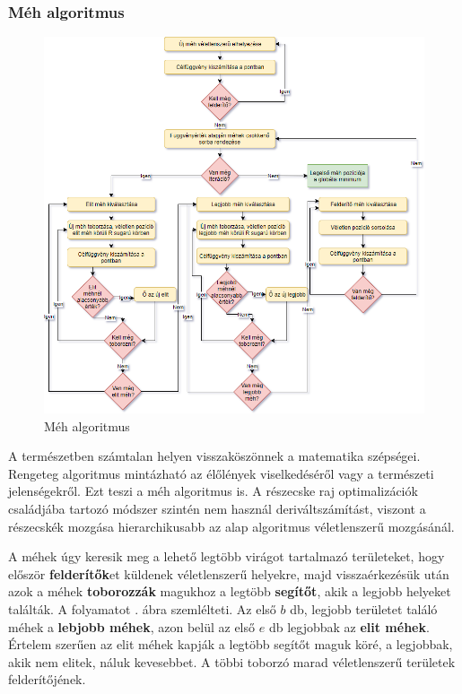 \subsubsection{Méh algoritmus}
\begin{figure}
	\centering
	\includegraphics[width=150mm, keepaspectratio]{figures/bees.png}
	\caption{Méh algoritmus}
	\label{fig:bees}
\end{figure}

A természetben számtalan helyen visszaköszönnek a matematika szépségei. Rengeteg algoritmus mintázható az élőlények viselkedéséről vagy a természeti jelenségekről. Ezt teszi a méh algoritmus is. A részecske raj optimalizációk családjába tartozó módszer szintén nem használ deriváltszámítást, viszont a részecskék mozgása hierarchikusabb az alap algoritmus véletlenszerű mozgásánál. 

A méhek úgy keresik meg a lehető legtöbb virágot tartalmazó területeket, hogy először \textbf{felderítők}et küldenek véletlenszerű helyekre, majd visszaérkezésük után azok a méhek \textbf{toborozzák} magukhoz a legtöbb \textbf{segítőt}, akik a legjobb helyeket találták. A folyamatot . ábra szemlélteti.
Az első $b$ db, legjobb területet találó méhek a \textbf{lebjobb méhek}, azon belül az első $e$ db legjobbak az \textbf{elit méhek}. Értelem szerűen az elit méhek kapják a legtöbb segítőt maguk köré, a legjobbak, akik nem elitek, náluk kevesebbet. A többi toborzó marad véletlenszerű területek felderítőjének.

